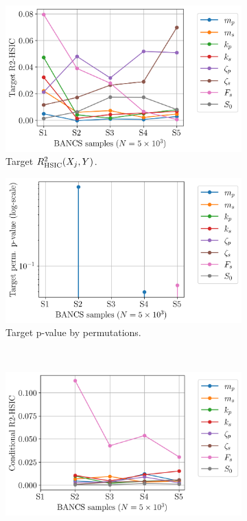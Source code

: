 \begin{figure}
    \centering
    \begin{subfigure}[b]{0.4\linewidth}
        \centering
        \includegraphics[width=\linewidth]{part3/figures/BANCS/oscillator_TR2HSIC.png}
        \caption{Target $R^2_{\mathrm{HSIC}}(X_j, Y)$.}
    \end{subfigure}
    \begin{subfigure}[b]{0.4\linewidth}
        \centering
        \includegraphics[width=\linewidth]{part3/figures/BANCS/oscillator_Tpvalue_permutation.png}
        \caption{Target p-value by permutations.}
    \end{subfigure}
    \\
    \begin{subfigure}[b]{0.4\linewidth}
        \centering
        \includegraphics[width=\linewidth]{part3/figures/BANCS/oscillator_CR2HSIC.png}

\end{subfigure}
\end{figure}
